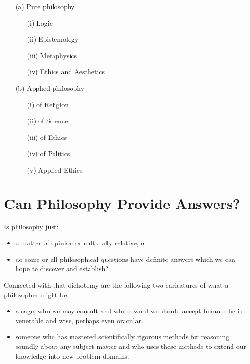 \documentclass[10pt,titlepage]{article}
\begin{document}
\begin{itemize}
\item[(a)] Pure philosophy
\begin{itemize}

\item[(i)] Logic

\item[(ii)] Epistemology
  
\item[(iii)] Metaphysics
  
\item[(iv)] Ethics and Aesthetics

\end{itemize}

\item[(b)] Applied philosophy
\begin{itemize}

\item[(i)] of Religion
  
\item[(ii)] of Science
  
\item[(iii)] of Ethics
  
\item[(iv)] of Politics
  
\item[(v)] Applied Ethics

\end{itemize}

\end{itemize}

\section{Can Philosophy Provide Answers?}\label{Answers}

Is philosophy just:
\begin{itemize}
\item a matter of opinion or culturally relative, or
\item do some or all philosophical questions have definite answers which we can hope to discover and establish?
\end{itemize}

Connected with that dichotomy are the following two caricatures of what a philosopher might be:
\begin{itemize}
\item a sage, who we may consult and whose word we should accept because he is venerable and wise, perhaps even oracular.
\item someone who has mastered scientifically rigorous methods for reasoning soundly about any subject matter and who uses these methods to extend our knowledge into new problem domains.
\end{itemize}
\end{document}
